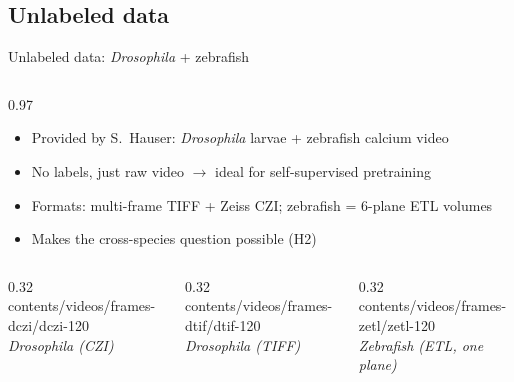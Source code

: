\subsection{Unlabeled data}

\begin{frame}[t]{Unlabeled data: \textit{Drosophila} + zebrafish}
\begin{columns}
\begin{column}{0.97\textwidth}
{\footnotesize\color{black}
\begin{itemize}\itemsep=0.15em
\item Provided by S.~Hauser: \textit{Drosophila} larvae + zebrafish calcium video
\item No labels, just raw video $\to$ ideal for self-supervised pretraining
\item Formats: multi-frame TIFF + Zeiss CZI; zebrafish = 6-plane ETL volumes
\item Makes the cross-species question possible (H2)
\end{itemize}}
\end{column}
\end{columns}

\vfill
\begin{columns}[t]
\begin{column}{0.32\textwidth}\centering
{}%
{contents/videos/frames-dczi/dczi-}{1}{20}\\[0.25em]
{\scriptsize\itshape Drosophila (CZI)}
\end{column}
\begin{column}{0.32\textwidth}\centering
{}%
{contents/videos/frames-dtif/dtif-}{1}{20}\\[0.25em]
{\scriptsize\itshape Drosophila (TIFF)}
\end{column}
\begin{column}{0.32\textwidth}\centering
{}%
{contents/videos/frames-zetl/zetl-}{1}{20}\\[0.25em]
{\scriptsize\itshape Zebrafish (ETL, one plane)}
\end{column}
\end{columns}

\vfill
{}
\end{frame}
